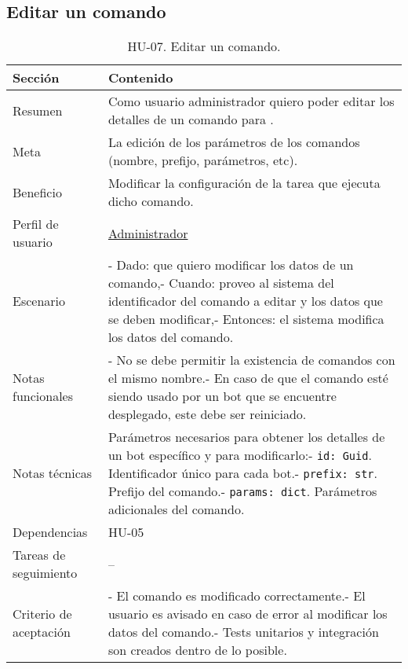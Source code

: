 \subsection{Editar un comando}

\begin{table}[H]
    \centering
    \def\arraystretch{1.25}
    \begin{adjustbox}{max width=\textwidth}
    \begin{tabularx}{\textwidth}{l|L}
    \hline
        \textbf{Sección} & \textbf{Contenido} \\ \hline
    \hline
        Resumen & Como usuario administrador quiero poder editar los detalles de un comando para . \\ \hline
        Meta & La edición de los parámetros de los comandos (nombre, prefijo, parámetros, etc). \\ \hline
        Beneficio & Modificar la configuración de la tarea que ejecuta dicho comando. \\ \hline
        Perfil de usuario & \hyperref[sec:personaAdmin]{Administrador} \\ \hline
        Escenario & - Dado: que quiero modificar los datos de un comando,\linebreak - Cuando: proveo al sistema del identificador del comando a editar y los datos que se deben modificar,\linebreak - Entonces: el sistema modifica los datos del comando. \\ \hline
        Notas funcionales & - No se debe permitir la existencia de comandos con el mismo nombre.\linebreak - En caso de que el comando esté siendo usado por un bot que se encuentre desplegado, este debe ser reiniciado. \\ \hline
        Notas técnicas & Parámetros necesarios para obtener los detalles de un bot específico y para modificarlo:\linebreak - \verb|id: Guid|. Identificador único para cada bot.\linebreak - \verb|prefix: str|. Prefijo del comando.\linebreak - \verb|params: dict|. Parámetros adicionales del comando. \\ \hline
        Dependencias & HU-05 \\ \hline
        Tareas de seguimiento & – \\ \hline
        Criterio de aceptación & - El comando es modificado correctamente.\linebreak - El usuario es avisado en caso de error al modificar los datos del comando.\linebreak - Tests unitarios y integración son creados dentro de lo posible. \\ \hline
    \end{tabularx}
    \end{adjustbox}
    \caption{HU-07. Editar un comando.}
\end{table}

